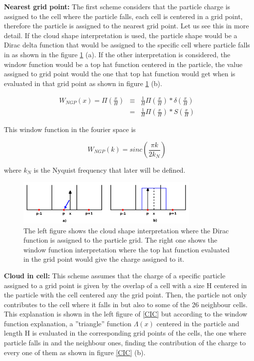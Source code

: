 \textbf{Nearest grid point: } The first scheme considers that the particle charge is 
assigned to the cell where the particle falls, each cell is centered 
in a grid point, therefore the particle is assigned to the nearest grid point. 
Let us see this in more detail. If the cloud shape interpretation is used, the particle 
shape would be a Dirac delta function that would be assigned to the specific cell 
where particle falls in as shown in the figure \ref{NGP} (a). If the other interpretation 
is considered, the window function would be a top hat function centered in the particle, 
the value assigned to grid point would the one that top hat function would get when is 
evaluated in that grid point as shown in figure \ref{NGP} (b). 

\begin{eqnarray*}
 W_{NGP}(x)  =  \Pi \left( \frac{x}{H} \right) & \equiv & \frac{1}{H}\Pi\left(\frac{x}{H}\right) *\delta \left(\frac{x}{H}\right) \\ 
&  = &\frac{1}{H}\Pi\left(\frac{x}{H}\right)*S\left(\frac{x}{H}\right)
\end{eqnarray*}

This window function in the fourier space is

\[ W_{NGP}(k)= sinc\left(\frac{\pi k}{2k_N} \right)\]

where $k_N$ is the Nyquist frequency that later will be defined. 

\begin{figure}[htbp]
       \centering
               \includegraphics[width=0.8\textwidth]{Images/chapter3/NGP.png}
       \caption{\small The left figure shows the cloud shape interpretation where the Dirac function
       is assigned to the particle grid. The right one shows the window function interpretation
       where the top hat function evaluated in the grid point would give the charge assigned to it. }
       \label{NGP}
 \end{figure}

\textbf{Cloud in cell: } This scheme assumes that the charge of a specific particle 
assigned to a grid point is given by the overlap of a cell with a size H centered in 
the particle with the cell centered any the grid point. Then, the particle not only 
contributes to the cell where it falls in but also to some of the 26 neighbour cells. 
This explanation is shown in the left figure of \ref{CIC} but according to the window 
function explanation, a ''triangle'' function $\Lambda(x)$ centered in the particle and length
H is evaluated in the corresponding grid points of the cells, the one where particle falls 
in and the neighbour ones, finding the contribution of the charge to every one of them
as shown in figure  \ref{CIC} (b).  


